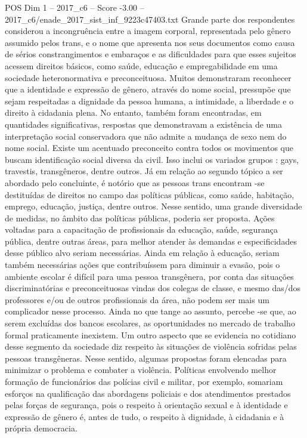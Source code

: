 \begin{textsample}{POS Dim 1 – 2017\_c6 – Score -3.00 – 2017\_c6/enade\_2017\_sist\_inf\_9223c47403.txt}
Grande parte dos respondentes considerou a incongruência entre a imagem corporal, representada pelo gênero assumido pelos trans, e o nome que apresenta nos seus documentos como causa de sérios constrangimentos e embaraços e as dificuldades para que esses sujeitos acessem direitos básicos, como saúde, educação e empregabilidade em uma sociedade heteronormativa e preconceituosa.
Muitos demonstraram reconhecer que a identidade e expressão de gênero, através do nome social, pressupõe que sejam respeitadas a dignidade da pessoa humana, a intimidade, a liberdade e o direito à cidadania plena.
No entanto, também foram encontradas, em quantidades significativas, respostas que demonstravam a existência de uma interpretação social conservadora que não admite a mudança de sexo nem do nome social.
Existe um acentuado preconceito contra todos os movimentos que buscam identificação social diversa da civil.
Isso inclui os variados grupos : gays, travestis, transgêneros, dentre outros.
Já em relação ao segundo tópico a ser abordado pelo concluinte, é notório que as pessoas trans encontram -se destituídas de direitos no campo das políticas públicas, como saúde, habitação, emprego, educação, justiça, dentre outros.
Nesse sentido, uma grande diversidade de medidas, no âmbito das políticas públicas, poderia ser proposta.
Ações voltadas para a capacitação de profissionais da educação, saúde, segurança pública, dentre outras áreas, para melhor atender às demandas e especificidades desse público alvo seriam necessárias.
Ainda em relação à educação, seriam também necessárias ações que contribuíssem para diminuir a evasão, pois o ambiente escolar é difícil para uma pessoa transgênera, por conta das situações discriminatórias e preconceituosas vindas dos colegas de classe, e mesmo das/dos professores e/ou de outros profissionais da área, não podem ser mais um complicador nesse processo.
Ainda no que tange ao assunto, percebe -se que, ao serem excluídas dos bancos escolares, as oportunidades no mercado de trabalho formal praticamente inexistem.
Um outro aspecto que se evidencia no cotidiano desse segmento da sociedade diz respeito às situações de violência sofridas pelas pessoas transgêneras.
Nesse sentido, algumas propostas foram elencadas para minimizar o problema e combater a violência.
Políticas envolvendo melhor formação de funcionários das polícias civil e militar, por exemplo, somariam esforços na qualificação das abordagens policiais e dos atendimentos prestados pelas forças de segurança, pois o respeito à orientação sexual e à identidade e expressão de gênero é, antes de tudo, o respeito à dignidade, à cidadania e à própria democracia.

\end{textsample}
